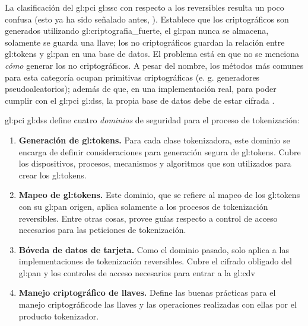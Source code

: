 

La clasificación del \gls{gl:pci} \gls{gl:ssc} con respecto a los reversibles
resulta un poco confusa (esto ya ha sido señalado antes, \cite{doc_sandra}).
Establece que los criptográficos son generados utilizando
\gls{gl:criptografia_fuerte}, el \gls{gl:pan} nunca se almacena, solamente se
guarda una llave; los no criptográficos guardan la relación entre
\glspl{gl:token} y \gls{gl:pan} en una base de datos. El problema está en que
no se menciona \textit{cómo} generar los no criptográficos. A pesar del nombre,
los métodos más comunes para esta categoría ocupan primitivas criptográficas
(e. g. generadores pseudoaleatorios); además de que, en una implementación
real, para poder cumplir con el \gls{gl:pci} \gls{gl:dss}, la propia base de
datos debe de estar cifrada \cite{pci_dss}.

\gls{gl:pci} \gls{gl:dss} define cuatro \textit{dominios} de seguridad para el
proceso de tokenización:
\begin{enumerate}
  \item \textbf{Generación de \glspl{gl:token}.} 
    Para cada clase tokenizadora, este dominio se encarga de definir 
    consideraciones para generación segura de \glspl{gl:token}. Cubre los
    dispositivos, procesos, mecanismos y algoritmos que son utilizados para
    crear los \glspl{gl:token}.
  \item \textbf{Mapeo de \glspl{gl:token}.}
    Este dominio, que se refiere al mapeo de los \glspl{gl:token} con su 
    \gls{gl:pan} origen, aplica solamente a los procesos de tokenización 
    reversibles. Entre otras cosas, provee guías respecto a control de acceso
    necesarios para las peticiones de tokenización.
  \item \textbf{Bóveda de datos de tarjeta.}
    Como el dominio pasado, solo aplica a las implementaciones de tokenización 
    reversibles. Cubre el cifrado obligado del \gls{gl:pan} y los controles de 
    acceso necesarios para entrar a la \gls{gl:cdv}
  \item \textbf{Manejo criptográfico de llaves.}
    Define las buenas prácticas para el manejo criptográficode las llaves y 
    las operaciones realizadas con ellas por el producto tokenizador.
\end{enumerate}





